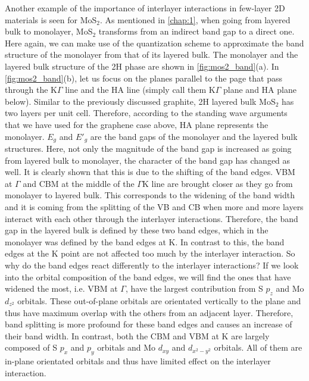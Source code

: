 Another example of the importance of interlayer interactions in few-layer 2D materials is seen for MoS$_2$. As mentioned in \autoref{chap:1}, when going from layered bulk to monolayer, MoS$_2$ transforms from an indirect band gap to a direct one. Here again, we can make use of the quantization scheme to approximate the band structure of the monolayer from that of its layered bulk. The monolayer and the layered bulk structure of the 2H phase are shown in \autoref{fig:mos2_band}(a). In \autoref{fig:mos2_band}(b), let us focus on the planes parallel to the page that pass through the $\mathrm{K}\Gamma$ line and the HA line (simply call them $\mathrm{K}\Gamma$ plane and HA plane below). Similar to the previously discussed graphite, 2H layered bulk MoS$_2$ has two layers per unit cell. Therefore, according to the standing wave arguments that we have used for the graphene case above, HA plane represents the monolayer. $E_g$ and $E'_g$ are the band gaps of the monolayer and the layered bulk structures. Here, not only the magnitude of the band gap is increased as going from layered bulk to monolayer, the character of the band gap has changed as well. It is clearly shown that this is due to the shifting of the band edges. VBM at $\Gamma$ and CBM at the middle of the $\Gamma\mathrm{K}$ line are brought closer as they go from monolayer to layered bulk. This corresponds to the widening of the band width and it is coming from the splitting of the VB and CB when more and more layers interact with each other through the interlayer interactions. Therefore, the band gap in the layered bulk is defined by these two band edges, which in the monolayer was defined by the band edges at $\mathrm{K}$. In contrast to this, the band edges at the $\mathrm{K}$ point are not affected too much by the interlayer interaction. So why do the band edges react differently to the interlayer interactions? If we look into the orbital composition of the band edges, we will find the ones that have widened the most, i.e. VBM at $\Gamma$, have the largest contribution from S $p_z$ and Mo $d_{z^2}$ orbitals. These out-of-plane orbitals are orientated vertically to the plane and thus have maximum overlap with the others from an adjacent layer. Therefore, band splitting is more profound for these band edges and causes an increase of their band width. In contrast, both the CBM and VBM at $\mathrm{K}$ are largely composed of S $p_x$ and $p_y$ orbitals and Mo $d_{xy}$ and $d_{x^2-y^2}$ orbitals. All of them are in-plane orientated orbitals and thus have limited effect on the interlayer interaction\cite{Padilha2014}.

